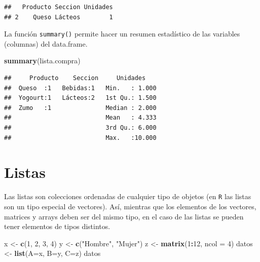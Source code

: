 \documentclass[]{book}
\newenvironment{Shaded}{\begin{snugshade}}{\end{snugshade}}
\newcommand{\DataTypeTok}[1]{\textcolor[rgb]{0.13,0.29,0.53}{#1}}
\newcommand{\DecValTok}[1]{\textcolor[rgb]{0.00,0.00,0.81}{#1}}
\newcommand{\KeywordTok}[1]{\textcolor[rgb]{0.13,0.29,0.53}{\textbf{#1}}}
\newcommand{\NormalTok}[1]{#1}
\newcommand{\OperatorTok}[1]{\textcolor[rgb]{0.81,0.36,0.00}{\textbf{#1}}}
\newcommand{\StringTok}[1]{\textcolor[rgb]{0.31,0.60,0.02}{#1}}
\begin{document}
\begin{verbatim}
##   Producto Seccion Unidades
## 2    Queso Lácteos        1
\end{verbatim}

La función \texttt{summary()} permite hacer un resumen estadístico de las
variables (columnas) del data.frame.

\begin{Shaded}
\begin{Highlighting}[]
\KeywordTok{summary}\NormalTok{(lista.compra)}
\end{Highlighting}
\end{Shaded}

\begin{verbatim}
##     Producto    Seccion     Unidades     
##  Queso  :1   Bebidas:1   Min.   : 1.000  
##  Yogourt:1   Lácteos:2   1st Qu.: 1.500  
##  Zumo   :1               Median : 2.000  
##                          Mean   : 4.333  
##                          3rd Qu.: 6.000  
##                          Max.   :10.000
\end{verbatim}

\hypertarget{listas}{%
\section{Listas}\label{listas}}

Las listas son colecciones ordenadas de cualquier tipo de objetos (en \texttt{R} las
listas son un tipo especial de vectores). Así, mientras que los elementos de
los vectores, matrices y arrays deben ser del mismo tipo, en el caso de las
listas se pueden tener elementos de tipos distintos.

\begin{Shaded}
\begin{Highlighting}[]
\NormalTok{x <-}\StringTok{ }\KeywordTok{c}\NormalTok{(}\DecValTok{1}\NormalTok{, }\DecValTok{2}\NormalTok{, }\DecValTok{3}\NormalTok{, }\DecValTok{4}\NormalTok{)}
\NormalTok{y <-}\StringTok{ }\KeywordTok{c}\NormalTok{(}\StringTok{"Hombre"}\NormalTok{, }\StringTok{"Mujer"}\NormalTok{)}
\NormalTok{z <-}\StringTok{ }\KeywordTok{matrix}\NormalTok{(}\DecValTok{1}\OperatorTok{:}\DecValTok{12}\NormalTok{, }\DataTypeTok{ncol =} \DecValTok{4}\NormalTok{)}
\NormalTok{datos <-}\StringTok{ }\KeywordTok{list}\NormalTok{(}\DataTypeTok{A=}\NormalTok{x, }\DataTypeTok{B=}\NormalTok{y, }\DataTypeTok{C=}\NormalTok{z)}
\NormalTok{datos}
\end{Highlighting}
\end{Shaded}
\end{document}
